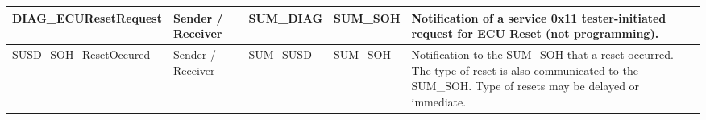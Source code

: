 \begin{longtable}{|l|l|l|l|l|}
\begin{minipage}{0.42\linewidth}\raggedright\vspace{.75ex}DIAG\_ECUResetRequest\vspace{.75ex}\end{minipage} & \begin{minipage}{0.07\linewidth}\raggedright\vspace{.75ex}Sender / Receiver\vspace{.75ex}\end{minipage} & \begin{minipage}{0.10\linewidth}\raggedright\vspace{.75ex}SUM\_DIAG\vspace{.75ex}\end{minipage} & \begin{minipage}{0.10\linewidth}\raggedright\vspace{.75ex}SUM\_SOH\vspace{.75ex}\end{minipage} & \begin{minipage}{0.17\linewidth}\raggedright\vspace{.75ex}Notification of a service 0x11 tester-initiated request for ECU Reset (not programming).\vspace{.75ex}\end{minipage}\\\hline
\begin{minipage}{0.42\linewidth}\raggedright\vspace{.75ex}SUSD\_SOH\_ResetOccured\vspace{.75ex}\end{minipage} & \begin{minipage}{0.07\linewidth}\raggedright\vspace{.75ex}Sender / Receiver\vspace{.75ex}\end{minipage} & \begin{minipage}{0.10\linewidth}\raggedright\vspace{.75ex}SUM\_SUSD\vspace{.75ex}\end{minipage} & \begin{minipage}{0.10\linewidth}\raggedright\vspace{.75ex}SUM\_SOH\vspace{.75ex}\end{minipage} & \begin{minipage}{0.17\linewidth}\raggedright\vspace{.75ex}Notification to the SUM\_SOH that a reset occurred. The type of reset is also communicated to the SUM\_SOH. Type of resets may be delayed or immediate.\vspace{.75ex}\end{minipage}\\\hline

\end{longtable}
